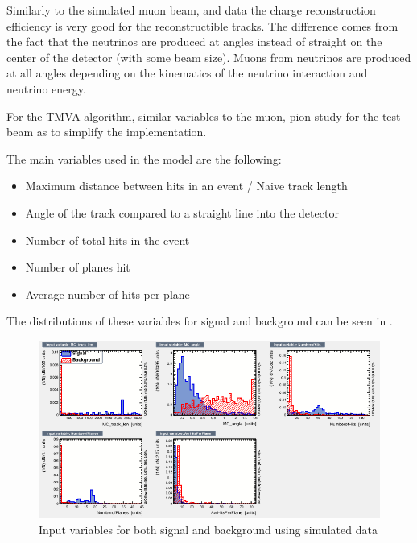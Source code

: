 Similarly to the simulated muon beam, and data the charge reconstruction efficiency is very good for the reconstructible tracks. The difference comes from the fact that the neutrinos are produced at angles instead of straight on the center of the detector (with some beam size). Muons from neutrinos are produced at all angles depending on the kinematics of the neutrino interaction and neutrino energy. 

For the TMVA algorithm, similar variables to the muon, pion study for the test beam as to simplify the implementation.

The main variables used in the model are the following:
\begin{itemize}
\item Maximum distance between hits in an event / Naive track length
\item Angle of the track compared to a straight line into the detector
\item Number of total hits in the event
\item Number of planes hit
\item Average number of hits per plane
\end{itemize}

The distributions of these variables for signal and background can be seen in .


\begin{figure}[h!]
\centering

\includegraphics[width=\textwidth]{figures/neutrinoTMVA/variables_id_c1.png}
\caption{Input variables for both signal and background using simulated data}
\label{fig:TMVANeuinput}
\end{figure}

